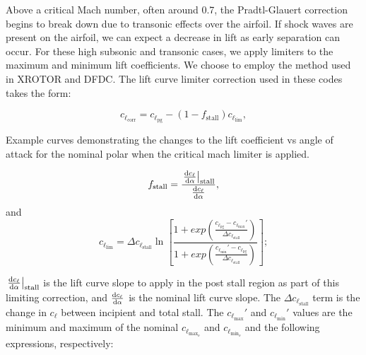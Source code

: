 Above a critical Mach number, often around 0.7, the Pradtl-Glauert correction begins to break down due to transonic effects over the airfoil.
%
If shock waves are present on the airfoil, we can expect a decrease in lift as early separation can occur.
%
For these high subsonic and transonic cases, we apply limiters to the maximum and minimum lift coefficients.
%
We choose to employ the method used in XROTOR and DFDC.
%
The lift curve limiter correction used in these codes takes the form:

\begin{equation}
    c_{\ell_\text{corr}} = c_{\ell_\text{pg}} - (1-f_\text{stall}) c_{\ell_\text{lim}},
\end{equation}

\where

\begin{marginfigure}
	
    \caption{Example curves demonstrating the changes to the lift coefficient vs angle of attack for the nominal polar when the critical mach limiter is applied.}
	\label{fig:clminmax-correction}
\end{marginfigure}

\begin{equation}
    f_\text{stall} = \frac{\left.\frac{\mathrm{d} c_\ell}{\mathrm{d} \alpha}\right|_\text{stall}}{\frac{\mathrm{d} c_\ell}{\mathrm{d} \alpha}},
\end{equation}
%
and
%
\begin{equation}
    c_{\ell_\text{lim}} = \Delta c_{\ell_\text{stall}} \ln \left[\frac{1 + exp\left(\frac{c_{\ell_\text{pg}}-c_{\ell_\text{max}}'}{\Delta c_{\ell_\text{stall}}}\right)}{1+exp\left(\frac{c_{\ell_\text{min}}'-c_{\ell_\text{pg}}}{\Delta c_{\ell_\text{stall}}}\right)}\right];
\end{equation}

\where \(\left.\frac{\mathrm{d} c_\ell}{\mathrm{d} \alpha}\right|_\text{stall}\) is the lift curve slope to apply in the post stall region as part of this limiting correction, and \(\frac{\mathrm{d} c_\ell}{\mathrm{d} \alpha}\) is the nominal lift curve slope.
%
The \(\Delta c_{\ell_\text{stall}}\) term is the change in \(c_\ell\) between incipient and total stall.
%
The \(c_{\ell_\text{max}}'\) and \(c_{\ell_\text{min}}'\) values are the minimum and maximum of the nominal \(c_{\ell_{\text{max}_o}}\) and \(c_{\ell_{\text{min}_o}}\) and the following expressions, respectively:

